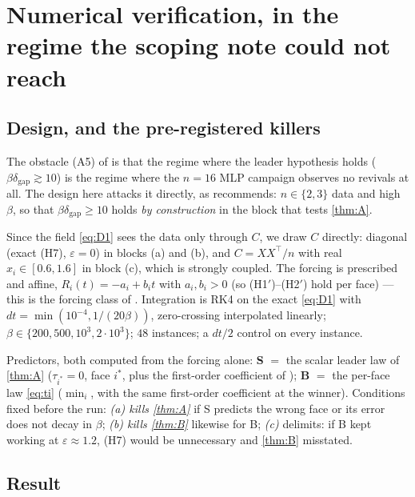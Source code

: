 \documentclass[11pt]{article}
\theoremstyle{remark}
\newcommand{\dgap}{\delta_{\mathrm{gap}}}
\newcommand{\hyplabel}[1]{\textup{(#1)}}
\begin{document}
\section{Numerical verification, in the regime the scoping note could not
reach}\label{sec:num}

\subsection{Design, and the pre-registered killers}

The obstacle (A5) of \cite{scoping} is that the regime where the leader
hypothesis holds ($\beta\dgap\gtrsim10$) is the regime where the $n{=}16$ MLP
campaign observes no revivals at all. The design here attacks it directly, as
\cite[\S6]{scoping} recommends: $n\in\{2,3\}$ data and high $\beta$, so that
$\beta\dgap\ge10$ holds \emph{by construction} in the block that tests
\cref{thm:A}.

Since the field \eqref{eq:D1} sees the data only through $C$, we draw $C$
directly: diagonal (exact \hyplabel{H7}, $\varepsilon=0$) in blocks (a) and (b),
and $C=XX^\top/n$ with real $x_i\in[0.6,1.6]$ in block (c), which is strongly
coupled. The forcing is prescribed and affine, $R_i(t)=-a_i+b_it$ with
$a_i,b_i>0$ (so \hyplabel{H1$'$}--\hyplabel{H2$'$} hold per face) --- this is
the forcing class of \cite[Thm.~6]{paper}. Integration is RK4 on the exact
\eqref{eq:D1} with $dt=\min(10^{-4},1/(20\beta))$, zero-crossing interpolated
linearly; $\beta\in\{200,500,10^3,2\cdot10^3\}$; $48$ instances; a $dt/2$
control on every instance.

Predictors, both computed from the forcing alone:
\textbf{S} $=$ the scalar leader law of \cref{thm:A} ($\tau_{i^\ast}=0$, face
$i^\ast$, plus the first-order coefficient of \cite[Thm.~6(ii)]{paper});
\textbf{B} $=$ the per-face law \eqref{eq:ti} ($\min_i$, with the same
first-order coefficient at the winner). Conditions fixed before the run:
\emph{(a) kills \cref{thm:A}} if S predicts the wrong face or its error does not
decay in $\beta$; \emph{(b) kills \cref{thm:B}} likewise for B; \emph{(c)}
delimits: if B kept working at $\varepsilon\approx1.2$, \hyplabel{H7} would be
unnecessary and \cref{thm:B} misstated.

\subsection{Result}
\end{document}
